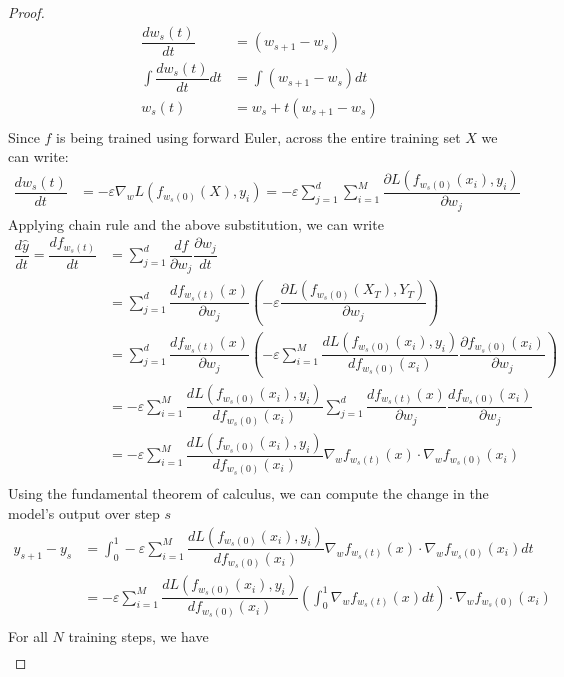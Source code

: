 \begin{proof}
\begin{align}
    \dfrac{d w_s(t)}{dt} &= (w_{s+1} - w_s)\\   
    \int \dfrac{d w_s(t)}{dt} dt &= \int (w_{s+1} - w_s)dt\\
    w_s(t) &= w_s + t(w_{s+1} - w_s)\\
\end{align}
Since $f$ is being trained using forward Euler, across the entire training set $X$ we can write:
\begin{align}
    \dfrac{d w_s(t)}{dt} &= -\varepsilon \nabla_w L(f_{w_s(0)}(X), y_i) = -\varepsilon \sum_{j = 1}^{d} \sum_{i=1}^M  \dfrac{\partial L(f_{w_s(0)}(x_i),  y_i)}{\partial w_j} \label{eq10}
\end{align}
Applying chain rule and the above substitution, we can write
\begin{align}
    \dfrac{d \hat y}{dt} = \dfrac{d f_{w_s(t)}}{dt} &= \sum_{j = 1}^{d} \dfrac{d f}{\partial w_j} \dfrac{\partial w_j}{dt}\\
&= \sum_{j = 1}^{d} \dfrac{d f_{w_s(t)}(x)}{\partial w_j} \left(-\varepsilon \dfrac{\partial L(f_{w_s(0)}(X_T),  Y_T)}{\partial w_j}\right)\\
&= \sum_{j = 1}^{d} \dfrac{d f_{w_s(t)}(x)}{\partial w_j} \left(-\varepsilon \sum_{i = 1}^{M}\dfrac{d L(f_{w_s(0)}(x_i),  y_i)}{d f_{w_s(0)}(x_i)}\dfrac{\partial  f_{w_s(0)}(x_i)}{\partial w_j}\right)\\
&= -\varepsilon \sum_{i = 1}^{M} \dfrac{d L(f_{w_s(0)}(x_i),  y_i)}{d f_{w_s(0)}(x_i)} \sum_{j = 1}^{d} \dfrac{d f_{w_s(t)}(x)}{\partial w_j}  \dfrac{d f_{w_s(0)}(x_i)}{\partial w_j}\\
&= -\varepsilon \sum_{i = 1}^{M} \dfrac{d L(f_{w_s(0)}(x_i),  y_i)}{d f_{w_s(0)}(x_i)} \nabla_w f_{w_s(t)}(x) \cdot \nabla_w f_{w_s(0)}(x_i)\\
\end{align}
Using the fundamental theorem of calculus, we can compute the change in the model's output over step $s$
\begin{align}
    y_{s+1} - y_s &= \int_0^1 -\varepsilon \sum_{i = 1}^{M} \dfrac{d L(f_{w_s(0)}(x_i),  y_i)}{d f_{w_s(0)}(x_i)}  \nabla_w f_{w_s(t)}(x) \cdot \nabla_w f_{w_s(0)}(x_i)dt\\
 &=  -\varepsilon \sum_{i = 1}^{M} \dfrac{d L(f_{w_s(0)}(x_i),  y_i)}{d f_{w_s(0)}(x_i)}  \left(\int_0^1\nabla_w f_{w_s(t)}(x)dt\right) \cdot \nabla_w f_{w_s(0)}(x_i)\\
\end{align}
For all $N$ training steps, we have
\begin{align*}

\end{align*}
\end{proof}
